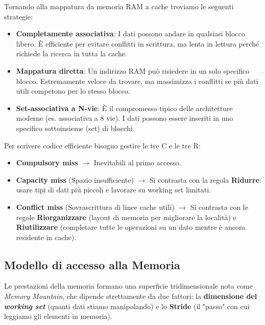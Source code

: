 Tornando alla mappatura da memoria RAM a cache troviamo le seguenti strategie:
\begin{itemize}
    \item \textbf{Completamente associativa}: I dati possono andare in qualsiasi blocco libero. È efficiente per evitare conflitti in scrittura, ma lenta in lettura perché richiede la ricerca in tutta la cache.
    \item \textbf{Mappatura diretta}: Un indirizzo RAM può risiedere in un solo specifico blocco. Estremamente veloce da trovare, ma massimizza i conflitti se più dati utili competono per lo stesso blocco.
    \item \textbf{Set-associativa a N-vie}: È il compromesso tipico delle architetture moderne (es. associativa a 8 vie). I dati possono essere inseriti in uno specifico sottoinsieme (set) di blocchi.
\end{itemize}
Per scrivere codice efficiente bisogno gestire le tre C e le tre R:
\begin{itemize}
    \item \textbf{Compulsory miss} $\rightarrow$ Inevitabili al primo accesso.
    \item \textbf{Capacity miss} (Spazio insufficiente) $\rightarrow$ Si contrasta con la regola \textbf{Ridurre}: usare tipi di dati più piccoli e lavorare su working set limitati.
    \item \textbf{Conflict miss} (Sovrascrittura di linee cache utili) $\rightarrow$ Si contrasta con le regole \textbf{Riorganizzare} (layout di memoria per migliorare la località) e \textbf{Riutilizzare} (completare tutte le operazioni su un dato mentre è ancora residente in cache).
\end{itemize}
\subsection{Modello di accesso alla Memoria}
Le prestazioni della memoria formano una superficie tridimensionale nota come \textit{Memory Mountain}, che dipende strettamente da due fattori: la \textbf{dimensione del \textit{working set}} (quanti dati stiamo manipolando) e lo \textbf{Stride} (il "passo" con cui leggiamo gli elementi in memoria). 

